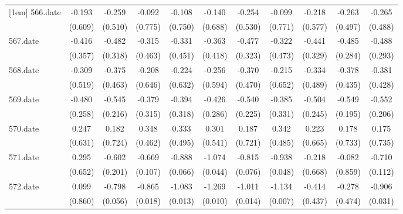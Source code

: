 \begin{tabular}{l*{10}{c}}
[1em]
566.date    &      -0.193&      -0.259&      -0.092&      -0.108&      -0.140&      -0.254&      -0.099&      -0.218&      -0.263&      -0.265\\
            &     (0.609)&     (0.510)&     (0.775)&     (0.750)&     (0.688)&     (0.530)&     (0.771)&     (0.577)&     (0.497)&     (0.488)\\
[1em]
567.date    &      -0.416&      -0.482&      -0.315&      -0.331&      -0.363&      -0.477&      -0.322&      -0.441&      -0.485&      -0.488\\
            &     (0.357)&     (0.318)&     (0.463)&     (0.451)&     (0.418)&     (0.323)&     (0.473)&     (0.329)&     (0.284)&     (0.293)\\
[1em]
568.date    &      -0.309&      -0.375&      -0.208&      -0.224&      -0.256&      -0.370&      -0.215&      -0.334&      -0.378&      -0.381\\
            &     (0.519)&     (0.463)&     (0.646)&     (0.632)&     (0.594)&     (0.470)&     (0.652)&     (0.489)&     (0.435)&     (0.428)\\
[1em]
569.date    &      -0.480&      -0.545&      -0.379&      -0.394&      -0.426&      -0.540&      -0.385&      -0.504&      -0.549&      -0.552\\
            &     (0.258)&     (0.216)&     (0.315)&     (0.318)&     (0.286)&     (0.225)&     (0.331)&     (0.245)&     (0.195)&     (0.206)\\
[1em]
570.date    &       0.247&       0.182&       0.348&       0.333&       0.301&       0.187&       0.342&       0.223&       0.178&       0.175\\
            &     (0.631)&     (0.724)&     (0.462)&     (0.495)&     (0.541)&     (0.721)&     (0.485)&     (0.665)&     (0.733)&     (0.735)\\
[1em]
571.date    &       0.295&      -0.602&      -0.669&      -0.888&      -1.074&      -0.815&      -0.938&      -0.218&      -0.082&      -0.710\\
            &     (0.652)&     (0.201)&     (0.107)&     (0.066)&     (0.044)&     (0.076)&     (0.048)&     (0.668)&     (0.859)&     (0.112)\\
[1em]
572.date    &       0.099&      -0.798&      -0.865&      -1.083&      -1.269&      -1.011&      -1.134&      -0.414&      -0.278&      -0.906\\
            &     (0.860)&     (0.056)&     (0.018)&     (0.013)&     (0.010)&     (0.014)&     (0.007)&     (0.437)&     (0.474)&     (0.031)\\

\end{tabular}

